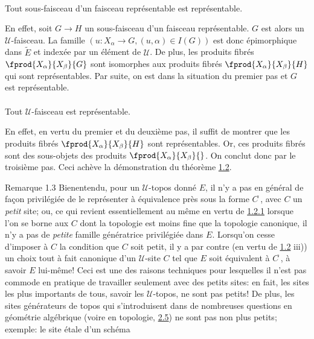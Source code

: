 \documentclass[10pt]{../fichiers-configuration-latex/smfart}
\begin{document}
\paragraph{}
Tout sous-faisceau d'un faisceau représentable est
représentable.

En effet, soit $G\rightarrow H$ un sous-faisceau d'un faisceau
représentable. $G$ est alors un $𝒰$-faisceau. La famille
$(u:X_{\alpha}\rightarrow G, (u,\alpha)\in I(G))$ est donc
épimorphique dans $\widetilde{E}$ et indexée par un élément
de $𝒰$. De plus, les produits fibrés
$\fprod{X_{\alpha}}{X_{\beta}}{G}$ sont isomorphes aux produits
fibrés $\fprod{X_{\alpha}}{X_{\beta}}{H}$ qui sont
représentables. Par suite, on est dans la situation du premier pas
et $G$ est représentable.

\paragraph{}
Tout $𝒰$-faisceau est représentable.

En effet, en vertu du premier et du deuxième pas, il suffit de
montrer que les produits fibrés $\fprod{X_{\alpha}}{X_{\beta}}{H}$
sont représentables. Or, ces produits fibrés sont des
sous-objets des produits $\fprod{X_{\alpha}}{X_{\beta}}{}$. On
conclut donc par le troisième pas. Ceci achève la
démonstration du théorème \hyperref[IV.theo1.2]{1.2}.

\begin{enonce*}[remark]{Remarque 1.3}
Bien\pageoriginale entendu, pour un $𝒰$-topos donné $E$, il
n'y a pas en général de façon privilégiée de le représenter à
équivalence près sous la forme $C^{\widetilde{\phantom{,}}}$, avec
$C$ un \emph{petit} site; ou, ce qui revient essentiellement au même
en vertu de \hyperref[IV.cor1.2.1]{1.2.1} lorsque l'on se borne aux $C$ dont la
topologie est moins fine que la topologie canonique, il n'y a pas de
\emph{petite} famille génératrice privilégiée dans
$E$. Lorsqu'on
cesse d'imposer à $C$ la condition que $C$ soit petit, il y a par
contre (en vertu de \hyperref[IV.theo1.2]{1.2} iii)) un choix tout à fait
canonique d'un $𝒰$-site $C$ tel que $E$ soit équivalent à
$C^{\widetilde{\phantom{,}}}$, à savoir $E$ lui-même! Ceci est une
des raisons techniques pour lesquelles il n'est pas commode en
pratique de travailler seulement avec des petits sites: en fait, les
sites les plus importants de tous, savoir les $𝒰$-topos, ne
sont pas petits! De plus, les sites générateurs de topos qui
s'introduisent dans de nombreuses questions en géométrie algébrique
(voire en topologie, \cf \hyperref[IV.subsec2.5]{2.5}) ne sont pas non plus
petits; exemple: le site étale d'un schéma 
\end{enonce*}
\end{document}
